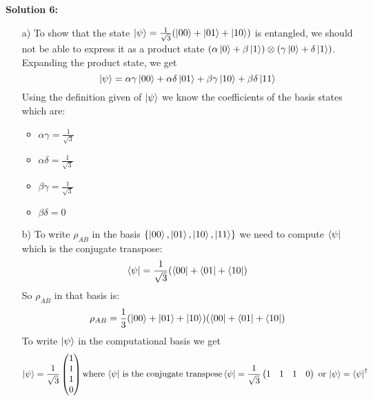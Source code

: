 \documentclass{article}
\begin{document}
\textbf{Solution 6:}\\
\begin{enumerate}
    \item[a)] To show that the state $\ket{\psi}=\frac{1}{\sqrt{3}}(\ket{00}+\ket{01}+\ket{10})$ is entangled, we should not be able to express it as a product state $(\alpha\ket{0}+\beta\ket{1})\otimes(\gamma\ket{0}+\delta\ket{1})$. Expanding the product state, we get $$\ket{\psi}=\alpha\gamma\ket{00}+\alpha\delta\ket{01}+\beta\gamma\ket{10}+\beta\delta\ket{11}$$ Using the definition given of $\ket{\psi}$ we know the coefficients of the basis states which are:
    \begin{itemize}
        \item $\alpha\gamma=\frac{1}{\sqrt{3}}$
        \item $\alpha\delta=\frac{1}{\sqrt{3}}$
        \item $\beta\gamma=\frac{1}{\sqrt{3}}$
        \item $\beta\delta=0$
    \end{itemize}
    \item[b)] To write $\rho_{AB}$ in the basis $\{\ket{00}, \ket{01}, \ket{10}, \ket{11} \}$ we need to compute $\bra{\psi}$ which is the conjugate transpose: $$\bra{\psi}=\frac{1}{\sqrt{3}}(\bra{00}+\bra{01}+\bra{10})$$ So $\rho_{AB}$ in that basis is: $$\rho_{AB}=\frac{1}{3}(\ket{00}+\ket{01}+\ket{10})(\bra{00}+\bra{01}+\bra{10})$$
    To write $\ket{\psi}$ in the computational basis we get $$\ket{\psi}=\frac{1}{\sqrt{3}}\begin{pmatrix}
        1 \\1\\1\\0
    \end{pmatrix} \text{where $\bra{\psi}$ is the conjugate transpose} \bra{\psi}=\frac{1}{\sqrt{3}}\begin{pmatrix}
        1 &1&1&0
    \end{pmatrix} \text{ or $\ket{\psi}=\bra{\psi}^\dagger$}$$

\end{enumerate}
\end{document}

